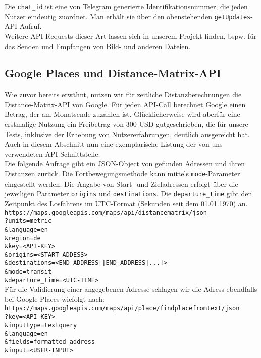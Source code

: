 Die \texttt{chat\_id} ist eine von Telegram generierte Identifikationsnummer, die jeden Nutzer eindeutig zuordnet. Man erhält sie über den obenstehenden \texttt{getUpdates}-API Aufruf.\\

Weitere API-Requests dieser Art lassen sich in unserem Projekt finden, bspw. für das Senden und Empfangen von Bild- und anderen Dateien.


\subsection{Google Places und Distance-Matrix-API}
Wie zuvor bereits erwähnt, nutzen wir für zeitliche Distanzberechnungen die Distance-Matrix-API von Google. Für jeden API-Call berechnet Google einen Betrag, der am Monatsende zuzahlen ist. Glücklicherweise wird aberfür eine erstmalige Nutzung ein Freibetrag von 300 USD gutgeschrieben, die für unsere Tests, inklusive der Erhebung von Nutzererfahrungen, deutlich ausgereicht hat.\\
Auch in diesem Abschnitt nun eine exemplarische Listung der von uns verwendeten API-Schnittstelle:\\

Die folgende Anfrage gibt ein JSON-Object von gefunden Adressen und ihren Distanzen zurück. Die Fortbewegungsmethode kann mittels \texttt{mode}-Parameter eingestellt werden. Die Angabe von Start- und Zieladressen erfolgt über die jeweiligen Parameter \texttt{origins} und \texttt{destinations}. Die \texttt{departure\_time} gibt den Zeitpunkt des Losfahrens im UTC-Format (Sekunden seit dem 01.01.1970) an.\\

\texttt{https://maps.googleapis.com/maps/api/distancematrix/json\\?units=metric\\\&language=en\\\&region=de\\\&key=<API-KEY>\\\&origins=<START-ADDESS>\\\&destinations=<END-ADDRESS[|END-ADDRESS|...]>\\\&mode=transit\\\&departure\_time=<UTC-TIME>}\\

Für die Validierung einer angegebenen Adresse schlagen wir die Adress ebendfalls bei Google Places wiefolgt nach:\\

\texttt{https://maps.googleapis.com/maps/api/place/findplacefromtext/json\\?key=<API-KEY>\\\&inputtype=textquery\\\&language=en\\\&fields=formatted\_address\\\&input=<USER-INPUT>}\\

